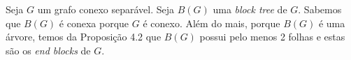 
Seja $G$ um grafo conexo separável. Seja $B(G)$ uma \emph{block tree} de $G$.
Sabemos que $B(G)$ é conexa porque $G$ é conexo. Além do mais, porque $B(G)$ é
uma árvore, temos da Proposição 4.2 que $B(G)$ possui pelo menos 2 folhas e
estas são os \emph{end blocks} de $G$.

